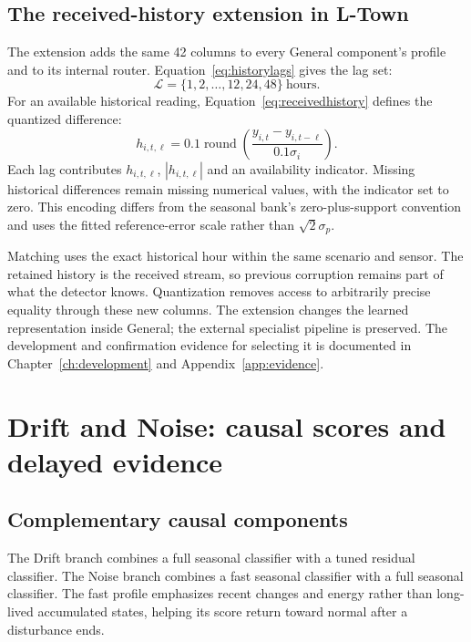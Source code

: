 \subsection{The received-history extension in L-Town}
The extension adds the same 42 columns to every General component's profile and to its internal router. Equation~\eqref{eq:historylags} gives the lag set:
\begin{equation}
 \mathcal L=\{1,2,\ldots,12,24,48\}\ \mathrm{hours}.\label{eq:historylags}
\end{equation}
For an available historical reading, Equation~\eqref{eq:receivedhistory} defines the quantized difference:
\begin{equation}
 h_{i,t,\ell}=0.1\operatorname{round}
 \left(\frac{y_{i,t}-y_{i,t-\ell}}{0.1\sigma_i}\right).
 \label{eq:receivedhistory}
\end{equation}
Each lag contributes $h_{i,t,\ell}$, $|h_{i,t,\ell}|$ and an availability indicator. Missing historical differences remain missing numerical values, with the indicator set to zero. This encoding differs from the seasonal bank's zero-plus-support convention and uses the fitted reference-error scale rather than $\sqrt{2}\sigma_p$.

Matching uses the exact historical hour within the same scenario and sensor. The retained history is the received stream, so previous corruption remains part of what the detector knows. Quantization removes access to arbitrarily precise equality through these new columns. The extension changes the learned representation inside General; the external specialist pipeline is preserved. The development and confirmation evidence for selecting it is documented in Chapter~\ref{ch:development} and Appendix~\ref{app:evidence}.

\section{Drift and Noise: causal scores and delayed evidence}
\subsection{Complementary causal components}
The Drift branch combines a full seasonal classifier with a tuned residual classifier. The Noise branch combines a fast seasonal classifier with a full seasonal classifier. The fast profile emphasizes recent changes and energy rather than long-lived accumulated states, helping its score return toward normal after a disturbance ends.

